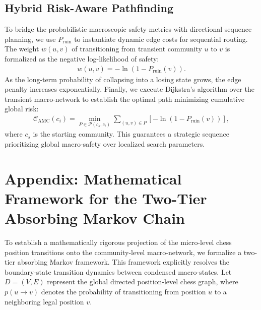 \documentclass[9pt,twocolumn,twoside]{pnas-report}
\begin{document}
\subsection*{Hybrid Risk-Aware Pathfinding}
To bridge the probabilistic macroscopic safety metrics with directional sequence planning, we use $P_{\text{ruin}}$ to instantiate dynamic edge costs for sequential routing. The weight $w(u, v)$ of transitioning from transient community $u$ to $v$ is formalized as the negative log-likelihood of safety:
\begin{align}
    w(u, v) = -\ln\left(1 - P_{\text{ruin}}(v)\right).
    \label{w_amc}
\end{align}
As the long-term probability of collapsing into a losing state grows, the edge penalty increases exponentially. Finally, we execute Dijkstra's algorithm over the transient macro-network to establish the optimal path minimizing cumulative global risk:
\begin{align}
    \mathcal{C}_{\text{AMC}}(c_i) = \min_{P \in \mathcal{P}(c_s, c_i)} \sum_{(u, v) \in P} \left[ -\ln(1 - P_{\text{ruin}}(v)) \right],
    \label{C_amc}
\end{align}
where $c_s$ is the starting community. This guarantees a strategic sequence prioritizing global macro-safety over localized search parameters.



\clearpage

\section*{Appendix: Mathematical Framework for the Two-Tier Absorbing Markov Chain}
\label{sec:appendix}

To establish a mathematically rigorous projection of the micro-level chess position transitions onto the community-level macro-network, we formalize a two-tier absorbing Markov framework. This framework explicitly resolves the boundary-state transition dynamics between condensed macro-states. Let $D = (V, E)$ represent the global directed position-level chess graph, where $p(u \to v)$ denotes the probability of transitioning from position $u$ to a neighboring legal position $v$.
\end{document}
